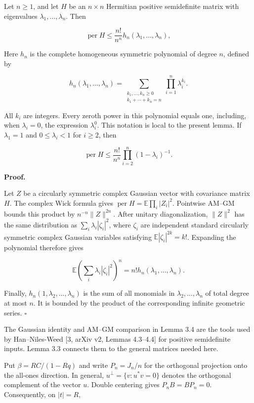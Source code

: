 \documentclass[11pt,a4paper]{article}
\begin{document}
Let \(n\ge1\), and let \(H\) be an \(n\times n\) Hermitian positive semidefinite matrix with eigenvalues \(\lambda_1,\ldots,\lambda_n\). Then

\[
\operatorname{per}H\le\frac{n!}{n^n}h_n(\lambda_1,\ldots,\lambda_n),
\]

Here \(h_n\) is the complete homogeneous symmetric polynomial of degree \(n\), defined by

\[
h_n(\lambda_1,\ldots,\lambda_n)
=\sum_{\substack{k_1,\ldots,k_n\ge0\\k_1+\cdots+k_n=n}}
\prod_{i=1}^n\lambda_i^{k_i}.
\]

All \(k_i\) are integers. Every zeroth power in this polynomial equals one, including, when \(\lambda_i=0\), the expression \(\lambda_i^0\). This notation is local to the present lemma. If \(\lambda_1=1\) and \(0\le\lambda_i<1\) for \(i\ge2\), then

\[
\operatorname{per}H\le\frac{n!}{n^n}
\prod_{i=2}^n(1-\lambda_i)^{-1}.
\]

\textbf{Proof.}

Let \(Z\) be a circularly symmetric complex Gaussian vector with covariance matrix \(H\). The complex Wick formula gives \(\operatorname{per}H=\mathbb E\prod_i|Z_i|^2\). Pointwise AM--GM bounds this product by \(n^{-n}\|Z\|^{2n}\). After unitary diagonalization, \(\|Z\|^2\) has the same distribution as \(\sum_i\lambda_i|\zeta_i|^2\), where \(\zeta_i\) are independent standard circularly symmetric complex Gaussian variables satisfying \(\mathbb E|\zeta_i|^{2k}=k!\). Expanding the polynomial therefore gives

\[
\mathbb E\left(\sum_i\lambda_i|\zeta_i|^2\right)^n
=n!h_n(\lambda_1,\ldots,\lambda_n).
\]

Finally, \(h_n(1,\lambda_2,\ldots,\lambda_n)\) is the sum of all monomials in \(\lambda_2,\ldots,\lambda_n\) of total degree at most \(n\). It is bounded by the product of the corresponding infinite geometric series. \(\square\)

The Gaussian identity and AM--GM comparison in Lemma 3.4 are the tools used by Han--Niles-Weed {[}3, arXiv v2, Lemmas 4.3--4.4{]} for positive semidefinite inputs. Lemma 3.3 connects them to the general matrices needed here.

Put \(\beta=RC/(1-Rq)\) and write \(P_n=J_n/n\) for the orthogonal projection onto the all-ones direction. In general, \(u^\perp=\{v:u^*v=0\}\) denotes the orthogonal complement of the vector \(u\). Double centering gives \(P_nB=BP_n=0\). Consequently, on \(|t|=R\),
\end{document}
